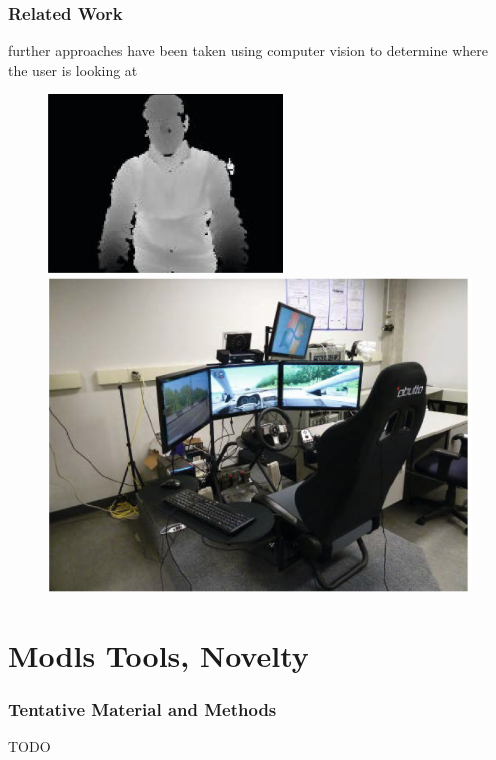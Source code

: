 \documentclass{beamer}
\begin{document}
	
	\begin{frame}
		\frametitle{Related Work}
		further approaches have been taken using computer vision to determine where the user is looking at 
		
		
		\begin{figure}
			\includegraphics{RanFor}
			\includegraphics[scale = .365]{RanForSim}
		\end{figure}
		\begin{figure}
			
			
			
		\end{figure}
	\end{frame}
	
	\section{Modls Tools, Novelty}	

    \begin{frame}
        \frametitle{Tentative Material and Methods}
        TODO

    \end{frame}
\end{document}

